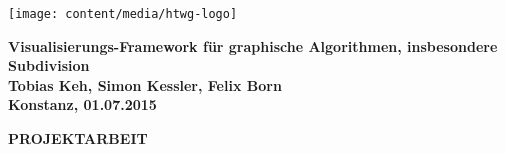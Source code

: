 \begin{titlepage}

\vspace*{-3.5cm}

\begin{flushleft}
\hspace*{-1cm} \texttt{[image: content/media/htwg-logo]}
\end{flushleft}

\vspace{2.5cm}

\begin{center}
	\huge{
		\textbf{Visualisierungs-Framework für graphische Algorithmen, insbesondere Subdivision} \\[5cm]
	}
	\Large{
		\textbf{Tobias Keh, Simon Kessler, Felix Born}} \\[6.5cm]
	\large{
		\textbf{Konstanz, 01.07.2015} \\[2.3cm]
	}
	
	\Huge{
		\textbf{{\sf PROJEKTARBEIT}}
	}
\end{center}

\end{titlepage}